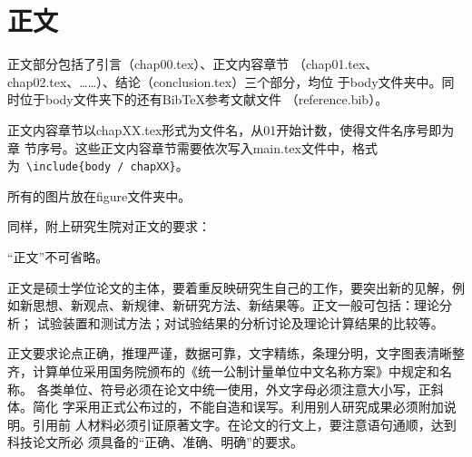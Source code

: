 \section{正文}
正文部分包括了引言（chap00.tex）、正文内容章节
（chap01.tex、chap02.tex、……）、结论（conclusion.tex）三个部分，均位
于body文件夹中。同时位于body文件夹下的还有Bib\TeX{}参考文献文件
（reference.bib）。

正文内容章节以chapXX.tex形式为文件名，从01开始计数，使得文件名序号即为章
节序号。这些正文内容章节需要依次写入main.tex文件中，格式
为~\texttt{\footnotesize \textbackslash include\{body / chapXX\}}。

所有的图片放在figure文件夹中。

同样，附上研究生院对正文的要求：

“正文”不可省略。

正文是硕士学位论文的主体，要着重反映研究生自己的工作，要突出新的见解，例
如新思想、新观点、新规律、新研究方法、新结果等。正文一般可包括：理论分析；
试验装置和测试方法；对试验结果的分析讨论及理论计算结果的比较等。

正文要求论点正确，推理严谨，数据可靠，文字精练，条理分明，文字图表清晰整
齐，计算单位采用国务院颁布的《统一公制计量单位中文名称方案》中规定和名称。
各类单位、符号必须在论文中统一使用，外文字母必须注意大小写，正斜体。简化
字采用正式公布过的，不能自造和误写。利用别人研究成果必须附加说明。引用前
人材料必须引证原著文字。在论文的行文上，要注意语句通顺，达到科技论文所必
须具备的“正确、准确、明确”的要求。

